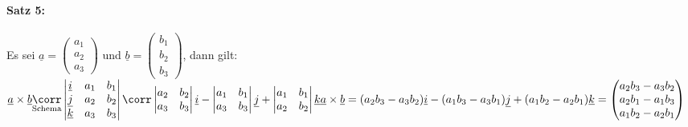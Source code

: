 \begin{enumerate}
\paragraph{Satz 5:} \parskp
Es sei $\underline{a}=\begin{pmatrix}
a_1\\
a_2\\
a_3
\end{pmatrix}$ und $\underline{b}=\begin{pmatrix}
b_1\\
b_2\\
b_3
\end{pmatrix}$, dann gilt:\\
$\underline{a} \times \underline{b} \underset{\text{Schema}}{\corr} \begin{vmatrix}
\underline{i}& a_1 & b_1\\
\underline{j} & a_2 & b_2\\
\underline{k} & a_3 & b_3
\end{vmatrix} \corr \begin{vmatrix}
a_2 & b_2\\
a_3 & b_3
\end{vmatrix} \underline{i} - \begin{vmatrix}
a_1 & b_1\\
a_3 & b_3
\end{vmatrix} \underline{j} + \begin{vmatrix}
a_1 & b_1 \\
a_2 & b_2
\end{vmatrix} \underline{k} \\
\underline{a} \times \underline{b}=(a_2b_3-a_3b_2)\underline{i}-(a_1b_3-a_3b_1)\underline{j}+(a_1b_2-a_2b_1)\underline{k}= \begin{pmatrix}
a_2b_3-a_3b_2\\
a_2b_1-a_1b_3\\
a_1b_2-a_2b_1
\end{pmatrix}$
\end{enumerate}

